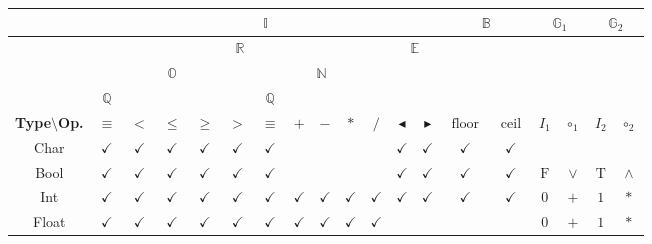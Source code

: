 \documentclass{jsarticle}
\newcommand{\htypeclassname}[1]{\mathbb{#1}}
\newcommand{\heq}{\equiv}
\newcommand{\hsucc}{\blacktriangleright}
\newcommand{\hpred}{\blacktriangleleft}
\newcommand{\hmin}{\mathop{\text{floor}}}
\newcommand{\hmax}{\mathop{\text{ceil}}}
\newcommand{\identity}{I}
\newcommand{\binaryop}{\circ}
\newcommand{\htrue}{\text{T}}
\newcommand{\hfalse}{\text{F}}
\begin{document}
\begin{center}
\begin{tabular}{||c||c|c|c|c|c|c|c|c|c|c|c|c|c|c|c|c|c|c||}
\hline
{ }
    &\multicolumn{12}{|c|}{$\htypeclassname{I}$}
    &\multicolumn{2}{|c|}{$\htypeclassname{B}$}
    &\multicolumn{2}{|c|}{$\htypeclassname{G}_1$}
    &\multicolumn{2}{|c||}{$\htypeclassname{G}_2$}\\
\hline
{ }
    &\multicolumn{10}{|c|}{$\htypeclassname{R}$}
    &\multicolumn{2}{|c|}{$\htypeclassname{E}$}
    &\multicolumn{2}{|c|}{ }
    &\multicolumn{2}{|c|}{ }
    &\multicolumn{2}{|c||}{ }\\
\hline
{ }
    &\multicolumn{5}{|c|}{$\htypeclassname{O}$}
    &\multicolumn{5}{|c|}{$\htypeclassname{N}$}
    &\multicolumn{2}{|c|}{ }
    &\multicolumn{2}{|c|}{ }
    &\multicolumn{2}{|c|}{ }
    &\multicolumn{2}{|c||}{ }\\
\hline
{ }
    &$\htypeclassname{Q}$
    &\multicolumn{4}{|c|}{ }
    &$\htypeclassname{Q}$
    &\multicolumn{4}{|c|}{ }
    &\multicolumn{2}{|c|}{ }
    &\multicolumn{2}{|c|}{ }
    &\multicolumn{2}{|c|}{ }
    &\multicolumn{2}{|c||}{ }\\
\hline
\textbf{Type$\setminus$Op.}
    &$\heq$
    &$<$
    &$\le$
    &$\ge$
    &$>$
    &$\equiv$
    &$+$
    &$-$
    &$*$
    &$/$
    &$\hpred$
    &$\hsucc$
    &$\hmin$
    &$\hmax$
    &$\identity_1$
    &$\binaryop_1$
    &$\identity_2$
    &$\binaryop_2$\\
\hline\hline
Char
    &$\checkmark$
    &$\checkmark$
    &$\checkmark$
    &$\checkmark$
    &$\checkmark$
    &$\checkmark$
    &
    &
    &
    &
    &$\checkmark$
    &$\checkmark$
    &$\checkmark$
    &$\checkmark$
    &
    &
    &
    &\\
\hline
Bool
    &$\checkmark$
    &$\checkmark$
    &$\checkmark$
    &$\checkmark$
    &$\checkmark$
    &$\checkmark$
    &
    &
    &
    &
    &$\checkmark$
    &$\checkmark$
    &$\checkmark$
    &$\checkmark$
    &$\hfalse$
    &$\vee$
    &$\htrue$
    &$\wedge$\\
\hline
Int
    &$\checkmark$
    &$\checkmark$
    &$\checkmark$
    &$\checkmark$
    &$\checkmark$
    &$\checkmark$
    &$\checkmark$
    &$\checkmark$
    &$\checkmark$
    &$\checkmark$
    &$\checkmark$
    &$\checkmark$
    &$\checkmark$
    &$\checkmark$
    &$0$
    &$+$
    &$1$
    &$\ast$\\
\hline
Float
    &$\checkmark$
    &$\checkmark$
    &$\checkmark$
    &$\checkmark$
    &$\checkmark$
    &$\checkmark$
    &$\checkmark$
    &$\checkmark$
    &$\checkmark$
    &$\checkmark$
    &
    &
    &
    &
    &$0$
    &$+$
    &$1$
    &$\ast$\\
\hline
\end{tabular}
\end{center}
\end{document}
